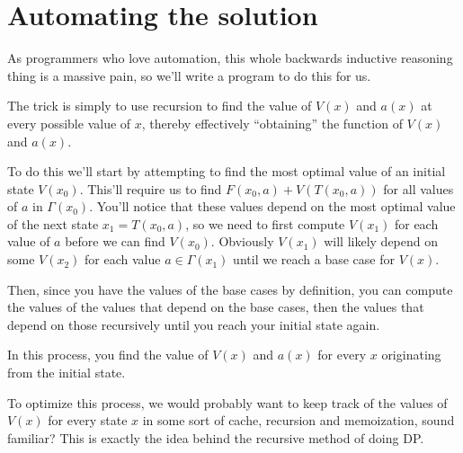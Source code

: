 \documentclass[a4paper, 12pt]{article}
\begin{document}
\section{Automating the solution}

As programmers who love automation, this whole backwards inductive reasoning thing is a massive pain, so we'll write a program to do this for us.

The trick is simply to use recursion to find the value of $V(x)$ and $a(x)$ at every possible value of $x$, thereby effectively ``obtaining'' the function of $V(x)$ and $a(x)$.

To do this we'll start by attempting to find the most optimal value of an initial state $V(x_{0})$. This'll require us to find $F(x_{0}, a) + V(T(x_{0}, a))$ for all values of $a$ in $\Gamma(x_{0})$. You'll notice that these values depend on the most optimal value of the next state $x_{1} = T(x_{0}, a)$, so we need to first compute $V(x_{1})$ for each value of $a$ before we can find $V(x_{0})$. Obviously $V(x_{1})$ will likely depend on some $V(x_{2})$ for each value $a \in \Gamma(x_{1})$ until we reach a base case for $V(x)$.

\begin{center}
\end{center}

Then, since you have the values of the base cases by definition, you can compute the values of the values that depend on the base cases, then the values that depend on those recursively until you reach your initial state again.

In this process, you find the value of $V(x)$ and $a(x)$ for every $x$ originating from the initial state.

To optimize this process, we would probably want to keep track of the values of $V(x)$ for every state $x$ in some sort of cache, recursion and memoization, sound familiar? This is exactly the idea behind the recursive method of doing DP.
\end{document}
